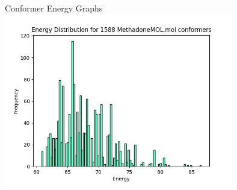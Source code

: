 \documentclass{beamer}
\begin{document}
\begin{frame}{Conformer Energy Graphs}
\includegraphics[width=10cm]{img/Graphs/MethadoneMOL_Energy_Histogram.png}
\end{frame}
\end{document}
